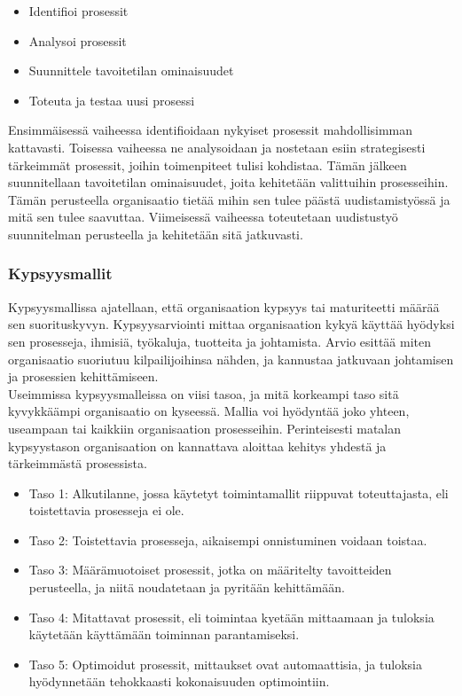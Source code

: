 \documentclass[finnish,12pt,a4paper,pdftex]{article}
\begin{document}
\begin{itemize}
\setlength{\itemsep}{0pt}
    \item Identifioi prosessit
    \item Analysoi prosessit
    \item Suunnittele tavoitetilan ominaisuudet
    \item Toteuta ja testaa uusi prosessi
\end{itemize}

\noindent Ensimmäisessä vaiheessa identifioidaan nykyiset prosessit mahdollisimman kattavasti. Toisessa vaiheessa ne analysoidaan ja nostetaan esiin strategisesti tärkeimmät prosessit, joihin toimenpiteet tulisi kohdistaa. Tämän jälkeen suunnitellaan tavoitetilan ominaisuudet, joita kehitetään valittuihin prosesseihin. Tämän perusteella organisaatio tietää mihin sen tulee päästä uudistamistyössä ja mitä sen tulee saavuttaa. Viimeisessä vaiheessa toteutetaan uudistustyö suunnitelman perusteella ja kehitetään sitä jatkuvasti. \citep{mohapatra}\\

\subsubsection{Kypsyysmallit}

Kypsyysmallissa ajatellaan, että organisaation kypsyys tai maturiteetti määrää sen suorituskyvyn. Kypsyysarviointi mittaa organisaation kykyä käyttää hyödyksi sen prosesseja, ihmisiä, työkaluja, tuotteita ja johtamista. Arvio esittää miten organisaatio suoriutuu kilpailijoihinsa nähden, ja kannustaa jatkuvaan johtamisen ja prosessien kehittämiseen. \citep{mohapatra}\\

\noindent Useimmissa kypsyysmalleissa on viisi tasoa, ja mitä korkeampi taso sitä kyvykkäämpi organisaatio on kyseessä. Mallia voi hyödyntää joko yhteen, useampaan tai kaikkiin organisaation prosesseihin. Perinteisesti matalan kypsyystason organisaation on kannattava aloittaa kehitys yhdestä ja tärkeimmästä prosessista. \citep{mohapatra}

\begin{itemize}
\setlength{\itemsep}{0pt}
    \item Taso 1: Alkutilanne, jossa käytetyt toimintamallit riippuvat toteuttajasta, eli toistettavia prosesseja ei ole.
    \item Taso 2: Toistettavia prosesseja, aikaisempi onnistuminen voidaan toistaa.
    \item Taso 3: Määrämuotoiset prosessit, jotka on määritelty tavoitteiden perusteella, ja niitä noudatetaan ja pyritään kehittämään.
    \item Taso 4: Mitattavat prosessit, eli toimintaa kyetään mittaamaan ja tuloksia käytetään käyttämään toiminnan parantamiseksi.
    \item Taso 5: Optimoidut prosessit, mittaukset ovat automaattisia, ja tuloksia hyödynnetään tehokkaasti kokonaisuuden optimointiin.
\end{itemize}
\end{document}
